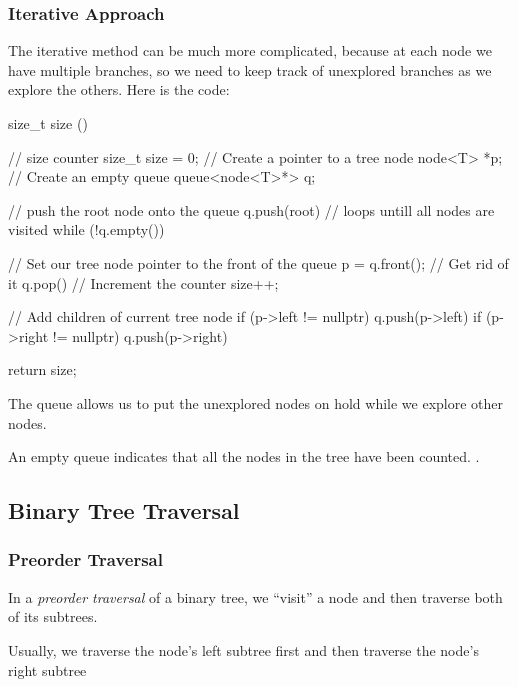 \documentclass{report}
\begin{document}
\subsubsection*{Iterative Approach}
The iterative method can be much more complicated, because at each node we have multiple branches, so we need to keep track of unexplored branches as we explore the others.
\bigbreak \noindent
Here is the code:
\begin{cppcode}
  size_t size () {
    // size counter
    size_t size = 0;
    // Create a pointer to a tree node
    node<T> *p;
    // Create an empty queue
    queue<node<T>*> q;

    // push the root node onto the queue
    q.push(root)
    // loops untill all nodes are visited
    while (!q.empty()) {
      // Set our tree node pointer to the front of the queue
      p = q.front();
      // Get rid of it
      q.pop()
      // Increment the counter
      size++;

      // Add children of current tree node 
      if (p->left != nullptr)
        q.push(p->left)
      if (p->right != nullptr)
        q.push(p->right)
    }
    return size;
  }
\end{cppcode}
\noindent The queue allows us to put the unexplored nodes on hold while we explore other nodes. \vspace{1.5mm}

\noindent An empty queue indicates that all the nodes in the tree have been counted.
.
\subsection{Binary Tree Traversal}
\subsubsection{Preorder Traversal}
In a \textit{preorder traversal} of a binary tree, we ``visit'' a node and then traverse both of its subtrees. \vspace{1.5mm} 

\noindent Usually, we traverse the node's left subtree first and then traverse the node's right subtree
\bigbreak \noindent
\end{document}
